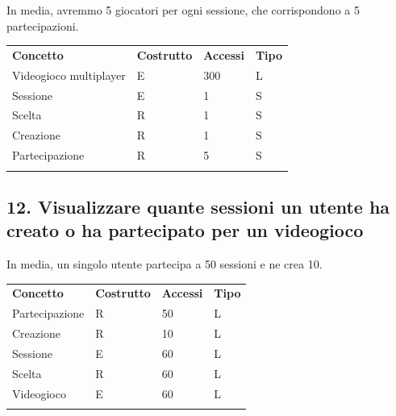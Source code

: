 \documentclass[a4paper,12pt]{report}
\begin{document}
In media, avremmo 5 giocatori per ogni sessione, che corrispondono a 5 partecipazioni.

\begin{table}[h!]
\begin{center}
	\begin{tabular}{ | m{4cm} P{4cm} P{4cm} P{4cm} | }
	 \textbf{Concetto} & \textbf{Costrutto} & \textbf{Accessi} & \textbf{Tipo} \\
	Videogioco multiplayer  	& E & 300 & L \\ \hline
	Sessione					& E & 1 & S \\ \hline
	Scelta					& R & 1 & S \\ \hline
	Creazione				& R & 1 & S \\ \hline
	Partecipazione			& R & 5 & S \\ \hline 
      \\ \hline
	\end{tabular}
\end{center}
\end{table}

\newpage

\subsection*{12. Visualizzare quante sessioni un utente ha creato o ha partecipato per un videogioco}

In media, un singolo utente partecipa a 50 sessioni e ne crea 10.

\begin{table}[h!]
\begin{center}
	\begin{tabular}{ | m{4cm} P{4cm} P{4cm} P{4cm} | }
	 \textbf{Concetto} & \textbf{Costrutto} & \textbf{Accessi} & \textbf{Tipo} \\
	Partecipazione & R & 50 & L \\ \hline
	Creazione      & R & 10 & L \\ \hline
	Sessione       & E & 60 & L \\ \hline
	Scelta		   & R & 60 & L \\ \hline
	Videogioco     & E & 60 & L \\ \hline
      \\ \hline
	\end{tabular}
\end{center}
\end{table}
\end{document}
